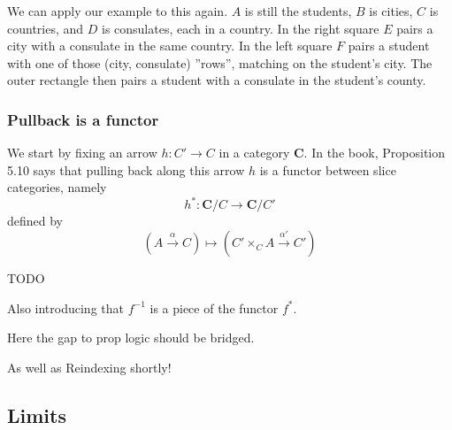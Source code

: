 \documentclass[11pt]{article}
\begin{document}
We can apply our example to this again. $A$ is still the students, $B$ is
cities, $C$ is countries, and $D$ is consulates, each in a country. In the
right square $E$ pairs a city with a consulate in the same country. In the left
square $F$ pairs a student with one of those (city, consulate) ''rows'',
matching on the student's city. The outer rectangle then pairs a student with a
consulate in the student's county.

\subsubsection{Pullback is a functor}

We start by fixing an arrow $h: C' \rightarrow C$ in a category $\mathbf{C}$.
In the book, Proposition 5.10 says that pulling back along this arrow $h$ is a
functor between slice categories, namely
$$
h^*: \mathbf{C}/C \rightarrow \mathbf{C}/C'
$$
defined by
$$
(A \overset{\alpha}{\rightarrow} C)
  \mapsto (C' \times_{C} A \overset{\alpha'}{\rightarrow} C')
$$

TODO

Also introducing that $f^{-1}$ is a piece of the functor $f^{*}$.

Here the gap to prop logic should be bridged.

As well as Reindexing shortly!

\subsection{Limits}
\end{document}
